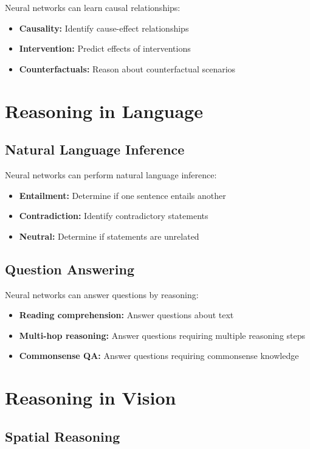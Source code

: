 Neural networks can learn causal relationships:
\begin{itemize}
    \item \textbf{Causality:} Identify cause-effect relationships
    \item \textbf{Intervention:} Predict effects of interventions
    \item \textbf{Counterfactuals:} Reason about counterfactual scenarios
\end{itemize}

\section{Reasoning in Language}

\subsection{Natural Language Inference}

Neural networks can perform natural language inference:
\begin{itemize}
    \item \textbf{Entailment:} Determine if one sentence entails another
    \item \textbf{Contradiction:} Identify contradictory statements
    \item \textbf{Neutral:} Determine if statements are unrelated
\end{itemize}

\subsection{Question Answering}

Neural networks can answer questions by reasoning:
\begin{itemize}
    \item \textbf{Reading comprehension:} Answer questions about text
    \item \textbf{Multi-hop reasoning:} Answer questions requiring multiple reasoning steps
    \item \textbf{Commonsense QA:} Answer questions requiring commonsense knowledge
\end{itemize}

\section{Reasoning in Vision}

\subsection{Spatial Reasoning}

